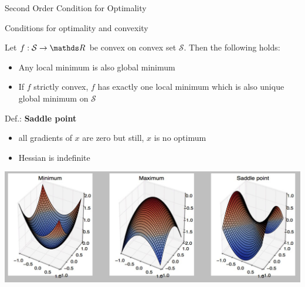 \documentclass[11pt,compress,t,notes=noshow, xcolor=table]{beamer}
\begin{document}
\begin{vbframe}{Second Order Condition for Optimality}




  
  \end{vbframe}

\begin{vbframe}{Conditions for optimality and convexity}

Let $f:\mathcal{S} \to \R$ be convex on convex set $\mathcal{S}$. Then the following holds:

\begin{itemize}
\item Any local minimum is also global minimum 
\item If $f$ strictly convex, $f$ has exactly one local minimum which is also unique global minimum on $\mathcal{S}$
\end{itemize}

\framebreak

Def.: \textbf{Saddle point}
\begin{itemize}
    \item all gradients of $x$ are zero but still, $x$ is no optimum
    \item Hessian is indefinite
\end{itemize}

\begin{center}
\includegraphics[scale= 0.5]{figure_man/convex.jpg}
\end{center}




\end{vbframe}


  \endlecture
  
\end{document}
